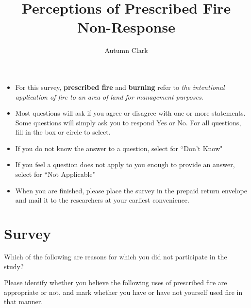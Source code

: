 \documentclass[
  english,
  checkmode = fill,
  ]{sdapsclassic}
\author{Autumn Clark}
\title{Perceptions of Prescribed Fire Non-Response}
\begin{document}
\begin{sloppypar}

  \begin{questionnaire}

    \begin{info}
\begin{itemize}
     \item For this survey, \textbf{prescribed fire} and \textbf{burning} refer to \emph{the intentional application of fire to an area of land for management purposes}.
      \item Most questions will ask if you agree or disagree with one or more statements. 
	     Some questions will simply ask you to respond Yes or No. 
	    For all questions, fill in the box or circle to select. 
      \item If you do not know the answer to a question, select {} for ``Don't Know"
      \item If you feel a question does not apply to you enough to provide an answer, select  for ``Not Applicable''
      \item When you are finished, please place the survey in the prepaid return envelope and mail it to the researchers at your earliest convenience.
\end{itemize}
    \end{info}
    
    \section{Survey}
    
        \begin{choicequestion}[cols=1]{Which of the following are reasons for which you did not participate in the study?}
    \end{choicequestion}
    
    
        \begin{choicegroup}[rowsep=0.25em]{Please identify whether you believe the following uses of prescribed fire are appropriate or not, and mark whether you have or have not yourself used fire in that manner.}
      

\end{choicegroup}
\end{questionnaire}
\end{sloppypar}
\end{document}
